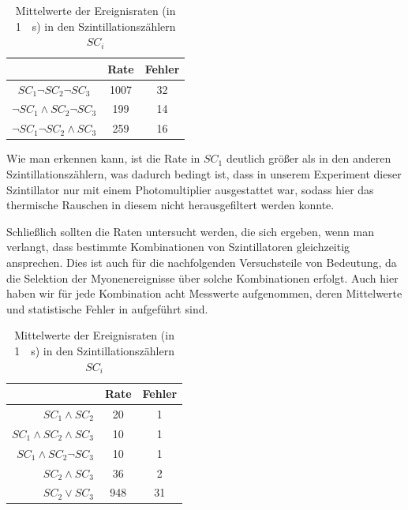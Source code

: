 \begin{table}[htbp]
\centering
\begin{tabular*}{0.8\columnwidth}{c|cc}
\toprule
& Rate & Fehler\\
\midrule
$SC_1 \neg SC_2 \neg SC_3$ & 1007 & 32\\
$\neg SC_1 \wedge SC_2 \neg SC_3$ & 199 & 14\\
$\neg SC_1 \neg SC_2 \wedge SC_3$ & 259 & 16\\
\bottomrule
\end{tabular*}
\caption{Mittelwerte der Ereignisraten (in \SI{1}{\per\second}) in den
Szintillationszählern $SC_i$}
\label{tab:einzelne_szintillatoren}
\end{table}

Wie man erkennen kann, ist die Rate in $SC_1$ deutlich größer als in den
anderen Szintillationszählern, was dadurch bedingt ist, dass in unserem
Experiment dieser Szintillator nur mit einem Photomultiplier ausgestattet war,
sodass hier das thermische Rauschen in diesem nicht herausgefiltert werden
konnte. 

Schließlich sollten die Raten untersucht werden, die sich ergeben, wenn man
verlangt, dass bestimmte Kombinationen von Szintillatoren gleichzeitig
ansprechen. Dies ist auch für die nachfolgenden Versuchsteile von Bedeutung, da
die Selektion der Myonenereignisse über solche Kombinationen erfolgt. Auch hier
haben wir für jede Kombination acht Messwerte aufgenommen, deren Mittelwerte
und statistische Fehler in  aufgeführt sind.

\begin{table}[htbp]
\centering
\begin{tabular*}{0.8\columnwidth}{r|cc}
\toprule
& Rate & Fehler\\
\midrule
$SC_1 \wedge SC_2$ & 20 & 1\\
$SC_1 \wedge SC_2 \wedge SC_3$ & 10 & 1\\
$SC_1 \wedge SC_2 \neg SC_3$ & 10 & 1\\
$SC_2 \wedge SC_3$ & 36 & 2\\
$SC_2 \vee SC_3$ & 948 & 31\\
\bottomrule
\end{tabular*}
\caption{Mittelwerte der Ereignisraten (in \SI{1}{\per\second}) in den
Szintillationszählern $SC_i$}
\label{tab:sc_kombinationen}
\end{table}


